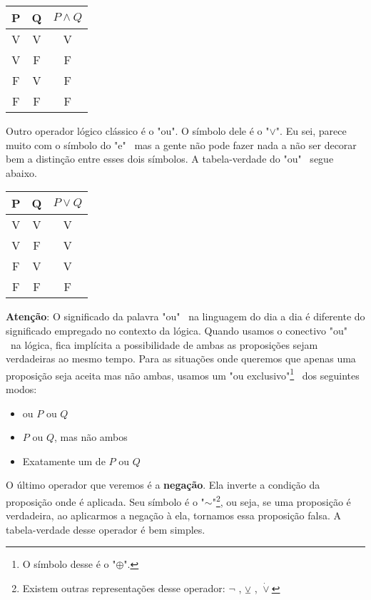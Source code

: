 \documentclass[a4paper,11pt,oneside]{book}
\theoremstyle{definition}
\theoremstyle{break}
\begin{document}
\begin{center}
\begin{tabular}{| c c || c | }
\hline
 P & Q & $P \land Q$ \\ 
 \hline
 V & V & V \\  
 V & F & F \\  
 F & V & F \\  
 F & F & F \\
 \hline
\end{tabular}
\end{center}

Outro operador lógico clássico é o "ou". O símbolo dele é o "$\lor$". Eu sei, parece muito com o símbolo do "e" \ mas a  gente não pode fazer nada a não ser decorar bem a distinção entre esses dois símbolos. A tabela-verdade do "ou" \ segue abaixo.

\begin{center}
\begin{tabular}{ | c c || c | }
\hline
 P & Q & $P \lor Q$ \\ 
 \hline
 V & V & V \\  
 V & F & V \\  
 F & V & V \\  
 F & F & F \\
 \hline
\end{tabular}
\end{center}

\textbf{Atenção}: O significado da palavra "ou" \ na linguagem do dia a dia é diferente do significado empregado no contexto da lógica. Quando usamos o conectivo "ou" \ na lógica, fica implícita a possibilidade de ambas as proposições sejam verdadeiras ao mesmo tempo. Para as situações onde queremos que apenas uma proposição seja aceita mas não ambas, usamos um "ou exclusivo"\footnote{O símbolo desse é o "$\oplus$".} \ dos seguintes modos: 

\begin{itemize}
\item ou $P$ ou $Q$
\item $P$ ou $Q$, mas não ambos
\item Exatamente um de $P$ ou $Q$
\end{itemize}

O último operador que veremos é a \textbf{negação}. Ela inverte a condição da proposição onde é aplicada. Seu símbolo é o "$\sim$"\footnote{Existem outras representações desse operador: $\lnot$ , $\veebar$ , $\dot\lor$}, ou seja, se uma proposição é verdadeira, ao aplicarmos a negação à ela, tornamos essa proposição falsa. A tabela-verdade desse operador é bem simples.
\end{document}

